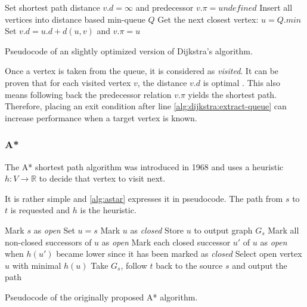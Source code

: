 			\begin{algorithm}[h]
				\begin{algorithmic}[1]
						\State Set shortest path distance $v.d = \infty$ and predecessor $v.\pi = undefined$
					\EndFor
					\State Insert all vertices into distance based min-queue $Q$
					\State
						\State Get the next closest vertex: $u = Q.min$ \label{alg:dijkstra:extract-queue}
								\State Set $v.d = u.d + d(u, v)$ and $v.\pi = u$
							\EndIf
						\EndFor
					\EndWhile
				\end{algorithmic}
				\caption{Pseudocode of an slightly optimized version of Dijkstra's algorithm.}
				\label{alg:dijkstra}
			\end{algorithm}
		
			Once a vertex is taken from the queue, it is considered as \emph{visited}.
			It can be proven that for each visited vertex $v$, the distance $v.d$ is optimal \cite[659-661]{cormen-introduction-to-alg}.
			This also means following back the predecessor relation $v.\pi$ yields the shortest path.
			Therefore, placing an exit condition after line \ref{alg:dijkstra:extract-queue} can increase performance when a target vertex is known.
		
		\subsubsection{A*}
		\label{subsubsec:astar}
		
			The A* shortest path algorithm was introduced in 1968 and uses a heuristic $h : V \rightarrow \mathbb{R}$ to decide that vertex to visit next.
			
			It is rather simple and \cref{alg:astar} expresses it in pseudocode.
			The path from $s$ to $t$ is requested and $h$ is the heuristic.
			
			\begin{algorithm}[h]
				\begin{algorithmic}[1]
					\State Mark $s$ as \emph{open}
					\State Set $u = s$
						\State Mark $u$ as \emph{closed}
						\State Store $u$ to output graph $G_s$
						\State Mark all non-closed successors of $u$ as \emph{open}
						\State Mark each closed successor $u'$ of $u$ as \emph{open} when $h(u')$ became lower since it has been marked as \emph{closed}
						\State Select open vertex $u$ with minimal $h(u)$
					\EndWhile
					\State Take $G_s$, follow $t$ back to the source $s$ and output the path
				\end{algorithmic}
				\caption{Pseudocode of the originally proposed A* algorithm.}
				\label{alg:astar}
			\end{algorithm}
		
